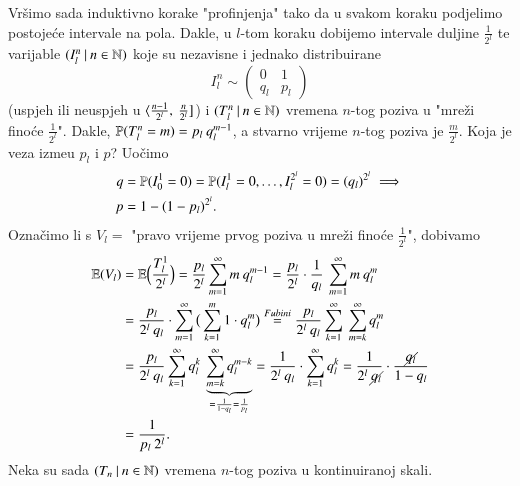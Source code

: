 \begin{pr}
    Vr\v simo sada induktivno korake "profinjenja" tako da u svakom koraku podjelimo postoje\' ce intervale na pola.
    Dakle, u $l$-tom koraku dobijemo intervale duljine $\frac{1}{2^l}$ te varijable $({I_l^n} \: | \: {n \in \mathbb{N}})$ koje su nezavisne i jednako distribuirane
    \begin{equation*}
        I_l^n \sim
        \begin{pmatrix}
            0 & 1 \\
            q_l & p_l
        \end{pmatrix}
    \end{equation*}
    (uspjeh ili neuspjeh u $\langle {\frac{n - 1}{2^l}}, \: {\frac{n}{2^l}}]$) i $({T_l^n} \: | \: {n \in \mathbb{N}})$ vremena $n$-tog poziva u "mre\v zi fino\' ce $\frac{1}{2^l}$".
    Dakle, $\mathbb{P}({T_l^n = m}) = p_l \: q_l^{m - 1}$, a stvarno vrijeme $n$-tog poziva je $\frac{m}{2^l}$.
    Koja je veza izme\dj u $p_l$ i $p$?
    Uo\v cimo
    \begin{equation*}
        \begin{aligned}
            q &= \mathbb{P}({I_0^1 = 0}) = \mathbb{P}({I_l^1 = 0, \ldots, I_l^{2^l} = 0}) = (q_l)^{2^l} \implies\\
            p &= 1 - (1 - p_l)^{2^l}.
        \end{aligned}
    \end{equation*}
    Ozna\v cimo li s $V_l =$ "pravo vrijeme prvog poziva u mre\v zi fino\' ce $\frac{1}{2^l}$", dobivamo
    \begin{equation*}
        \begin{aligned}
            \mathbb{E} (V_l) &= \mathbb{E} \Big(\frac{T_l^1}{2^l} \Big) = \frac{p_l}{2^l} \sum\limits_{m = 1}^{\infty} m \: q_l^{m - 1} = \frac{p_l}{2^l} \cdot \frac{1}{q_l} \: \sum\limits_{m = 1}^{\infty} m \: q_l^m\\
            &= \frac{p_l}{2^l \: q_l} \cdot \sum\limits_{m = 1}^{\infty} \big( \sum\limits_{k = 1}^{m} 1 \cdot q_l^m \big) \overset{Fubini}{=} \frac{p_l}{2^l \: q_l} \sum\limits_{k = 1}^{\infty} \: \sum\limits_{m = k}^{\infty} q_l^m\\
            &= \frac{p_l}{2^l \: q_l} \sum\limits_{k = 1}^{\infty} q_l^k \: \underbrace{\sum\limits_{m = k}^{\infty} q_l^{m - k}}_{= \frac{1}{1-q_l} = \frac{1}{p_l}} = \frac{1}{2^l \: q_l} \cdot \sum\limits_{k = 1}^{\infty} q_l^k = \frac{1}{2^l \: \cancel{q_l}} \cdot \frac{\cancel{q_l}}{1 - q_l}\\
            &= \frac{1}{p_l \: 2^l}.
        \end{aligned}
    \end{equation*}
    Neka su sada $({T_n} \: | \: {n \in \mathbb{N}})$ vremena $n$-tog poziva u kontinuiranoj skali.

\end{pr}
